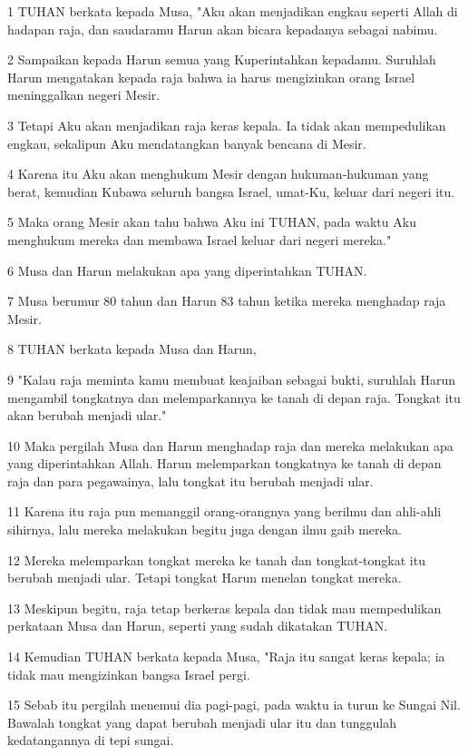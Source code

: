 \par 1 TUHAN berkata kepada Musa, "Aku akan menjadikan engkau seperti Allah di hadapan raja, dan saudaramu Harun akan bicara kepadanya sebagai nabimu.
\par 2 Sampaikan kepada Harun semua yang Kuperintahkan kepadamu. Suruhlah Harun mengatakan kepada raja bahwa ia harus mengizinkan orang Israel meninggalkan negeri Mesir.
\par 3 Tetapi Aku akan menjadikan raja keras kepala. Ia tidak akan mempedulikan engkau, sekalipun Aku mendatangkan banyak bencana di Mesir.
\par 4 Karena itu Aku akan menghukum Mesir dengan hukuman-hukuman yang berat, kemudian Kubawa seluruh bangsa Israel, umat-Ku, keluar dari negeri itu.
\par 5 Maka orang Mesir akan tahu bahwa Aku ini TUHAN, pada waktu Aku menghukum mereka dan membawa Israel keluar dari negeri mereka."
\par 6 Musa dan Harun melakukan apa yang diperintahkan TUHAN.
\par 7 Musa berumur 80 tahun dan Harun 83 tahun ketika mereka menghadap raja Mesir.
\par 8 TUHAN berkata kepada Musa dan Harun,
\par 9 "Kalau raja meminta kamu membuat keajaiban sebagai bukti, suruhlah Harun mengambil tongkatnya dan melemparkannya ke tanah di depan raja. Tongkat itu akan berubah menjadi ular."
\par 10 Maka pergilah Musa dan Harun menghadap raja dan mereka melakukan apa yang diperintahkan Allah. Harun melemparkan tongkatnya ke tanah di depan raja dan para pegawainya, lalu tongkat itu berubah menjadi ular.
\par 11 Karena itu raja pun memanggil orang-orangnya yang berilmu dan ahli-ahli sihirnya, lalu mereka melakukan begitu juga dengan ilmu gaib mereka.
\par 12 Mereka melemparkan tongkat mereka ke tanah dan tongkat-tongkat itu berubah menjadi ular. Tetapi tongkat Harun menelan tongkat mereka.
\par 13 Meskipun begitu, raja tetap berkeras kepala dan tidak mau mempedulikan perkataan Musa dan Harun, seperti yang sudah dikatakan TUHAN.
\par 14 Kemudian TUHAN berkata kepada Musa, "Raja itu sangat keras kepala; ia tidak mau mengizinkan bangsa Israel pergi.
\par 15 Sebab itu pergilah menemui dia pagi-pagi, pada waktu ia turun ke Sungai Nil. Bawalah tongkat yang dapat berubah menjadi ular itu dan tunggulah kedatangannya di tepi sungai.
